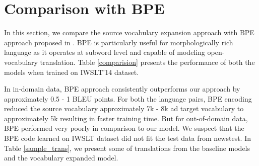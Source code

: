 \section{Comparison with BPE}
In this section, we compare the source vocabulary expansion approach with BPE approach proposed in \cite{sennrich2015neural}. BPE is particularly useful for morphologically rich language as it operates at subword level and capable of modeling open-vocabulary translation. Table \ref{comparision} presents the performance of both the models when trained on IWSLT'14 dataset. 

In in-domain data, BPE approach consistently outperforms our approach by approximately 0.5 - 1 BLEU points. For both the language pairs, BPE encoding reduced the source vocabulary approximately 7k - 8k ad target vocabulary to approximately 5k resulting in faster training time. But for out-of-domain data, BPE performed very poorly in comparison to our model. We suspect that the BPE code learned on IWSLT dataset did not fit the test data from newstest. In Table \ref{sample_trans}, we present some of translations from the baseline models and the vocabulary expanded model. 
